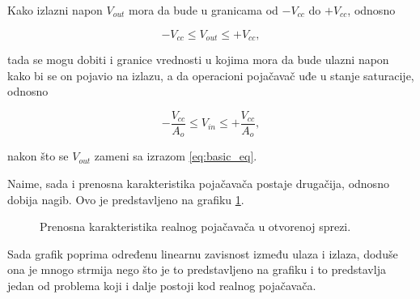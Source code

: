{Kako izlazni napon $V_{out}$ mora da bude u granicama od $-V_{cc}$ do $+V_{cc}$, odnosno}

\begin{equation}
    -V_{cc} \le V_{out} \le +V_{cc},
\end{equation}

{tada se mogu dobiti i granice vrednosti u kojima mora da bude ulazni napon kako bi se on pojavio na izlazu, a da operacioni pojačavač uđe u stanje saturacije, odnosno}

\begin{equation}
    -\frac{V_{cc}}{A_o} \le V_{in} \le +\frac{V_{cc}}{A_o},
\end{equation}

{nakon što se $V_{out}$ zameni sa izrazom \ref{eq:basic_eq}.}

{Naime, sada i prenosna karakteristika pojačavača postaje drugačija, odnosno dobija nagib. Ovo je predstavljeno na grafiku \ref{fig:opamp_real_nofb_transfer}.}

\begin{figure}[H]
    \centering

    \caption{Prenosna karakteristika
    realnog pojačavača u otvorenoj sprezi.}
    \label{fig:opamp_real_nofb_transfer}
\end{figure}

{Sada grafik poprima određenu linearnu zavisnost između ulaza i izlaza, doduše ona je mnogo strmija nego što je to predstavljeno na grafiku i to predstavlja jedan od problema koji i dalje postoji kod realnog pojačavača.}